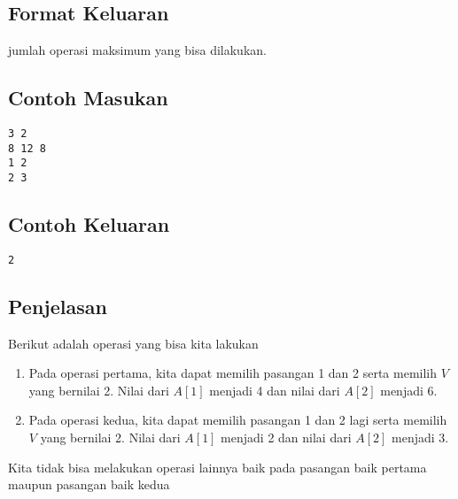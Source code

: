 \documentclass{article}
\begin{document}
\subsection*{Format Keluaran}

jumlah operasi maksimum yang bisa dilakukan.
\\

\begin{multicols}{2}
\subsection*{Contoh Masukan}
\begin{lstlisting}
3 2
8 12 8
1 2
2 3

\end{lstlisting}
\columnbreak
\subsection*{Contoh Keluaran}
\begin{lstlisting}
2
\end{lstlisting}
\vfill
\null
\end{multicols}

\subsection*{Penjelasan}
Berikut adalah operasi yang bisa kita lakukan
\begin{enumerate}
    \item Pada operasi pertama, kita dapat memilih pasangan 1 dan 2 serta memilih $V$ yang bernilai 2. Nilai dari $A[1]$ menjadi 4 dan nilai dari $A[2]$ menjadi 6.
    \item Pada operasi kedua, kita dapat memilih pasangan 1 dan 2 lagi serta memilih $V$ yang bernilai 2. Nilai dari $A[1]$ menjadi 2 dan nilai dari $A[2]$ menjadi 3.
\end{enumerate}
Kita tidak bisa melakukan operasi lainnya baik pada pasangan baik pertama maupun pasangan baik kedua

\pagebreak
\end{document}
